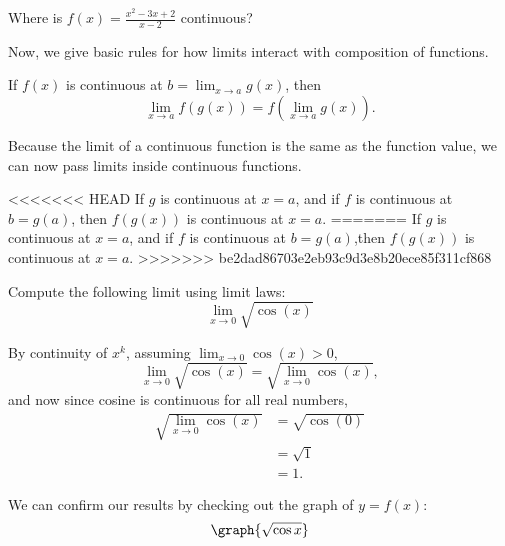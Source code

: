 \documentclass{ximera}
\begin{document}
\begin{question}
  Where is $f(x) = \frac{x^2-3x+2}{x-2}$ continuous?
  \begin{multipleChoice}
  \end{multipleChoice}
\end{question}


Now, we give basic rules for how limits interact with composition
of functions.

\begin{theorem}
  If $f(x)$ is continuous at $b = \lim_{x\to a} g(x)$, then
  \[
  \lim_{x\to a} f(g(x)) = f(\lim_{x\to a} g(x)).
  \]
\end{theorem}

Because the limit of a continuous function is the same as the function
value, we can now pass limits inside continuous functions.

\begin{corollary}
<<<<<<< HEAD
If $g$ is continuous at $x=a$, and if $f $ is continuous at $b=g(a)$,  then $f(g(x))$ is continuous at $x=a$.
=======
If $g$ is continuous at $x=a$, and if $f $ is continuous at $b=g(a)$,then $f(g(x))$ is continuous at $x=a$.
>>>>>>> be2dad86703e2eb93c9d3e8b20ece85f311cf868
\end{corollary}

\begin{example}
  Compute the following limit using limit laws:
  \[
  \lim_{x \to 0} \sqrt{\cos(x)}
  \]
  \begin{explanation}
    By continuity of $x^k$, assuming $\lim_{x \to 0} \cos(x) >0$,
    \[
    \lim_{x \to 0} \sqrt{\cos(x)} = \sqrt{\lim_{x \to 0} \cos(x)},
    \]
    and now since cosine is continuous for all real numbers,
    \begin{align*}
    \sqrt{\lim_{x \to 0} \cos(x)} & =\sqrt{\cos(0)}\\
    &= \sqrt{1}\\
    &= 1.
    \end{align*}
  \begin{onlineOnly}
    We can confirm our results by checking out the graph of $y=f(x)$:
    \[
    \graph{\sqrt{\cos{x}}}
    \]
  \end{onlineOnly}
  \end{explanation}
\end{example}
\end{document}
